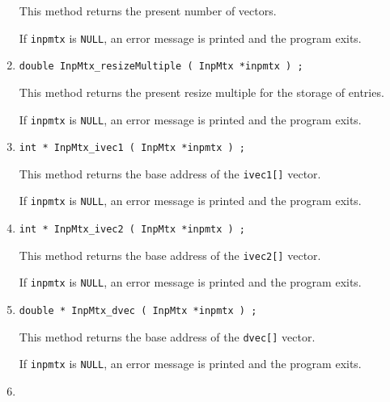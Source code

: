 \begin{enumerate}
This method returns the present number of vectors.
\par {}
If {\tt inpmtx} is {\tt NULL},
an error message is printed and the program exits.
\item
\begin{verbatim}
double InpMtx_resizeMultiple ( InpMtx *inpmtx ) ;
\end{verbatim}
This method returns the present resize multiple for the storage of
entries.
\par {}
If {\tt inpmtx} is {\tt NULL},
an error message is printed and the program exits.
\item
\begin{verbatim}
int * InpMtx_ivec1 ( InpMtx *inpmtx ) ;
\end{verbatim}
This method returns the base address of the {\tt ivec1[]} vector.
\par {}
If {\tt inpmtx} is {\tt NULL},
an error message is printed and the program exits.
\item
\begin{verbatim}
int * InpMtx_ivec2 ( InpMtx *inpmtx ) ;
\end{verbatim}
This method returns the base address of the {\tt ivec2[]} vector.
\par {}
If {\tt inpmtx} is {\tt NULL},
an error message is printed and the program exits.
\item
\begin{verbatim}
double * InpMtx_dvec ( InpMtx *inpmtx ) ;
\end{verbatim}
This method returns the base address of the {\tt dvec[]} vector.
\par {}
If {\tt inpmtx} is {\tt NULL},
an error message is printed and the program exits.
\item
\begin{verbatim}

\end{verbatim}
\end{enumerate}
